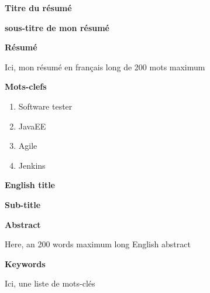 \clearpage
\ifodd\thepage\hbox{}\newpage\else\fi%
\thispagestyle{empty}\parindent=0pt
{\Large \textbf{Titre du r\'{e}sum\'{e}}}

{\large \textbf{sous-titre de mon r\'{e}sum\'{e}}}

\hrulefill%
\begin{center}
{\Large \textbf{R\'{e}sum\'{e}}}
\end{center}
Ici, mon r\'{e}sum\'{e} en français long de 200 mots maximum

\hrulefill%

{\Large \textbf{Mots-clefs}}

\hrulefill%
\begin{enumerate}
\item Software tester
\item JavaEE
\item Agile
\item Jenkins
\end{enumerate}







{\Large \textbf{English title}}

{\large \textbf{Sub-title}}

\hrulefill%
\begin{center}
{\Large \textbf{Abstract}}
\end{center}
Here, an 200 words maximum long English abstract

\hrulefill%

{\Large \textbf{Keywords}}

\hrulefill%

Ici, une liste de mots-cl\'{e}s







